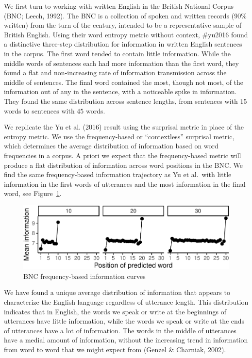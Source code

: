 \documentclass[man,floatsintext]{apa6}
\begin{document}
We first turn to working with written English in the British National Corpus (BNC; Leech, 1992). The BNC is a collection of spoken and written records (90\% written) from the turn of the century, intended to be a representative sample of British English. Using their word entropy metric without context, \#yu2016 found a distinctive three-step distribution for information in written English sentences in the corpus. The first word tended to contain little information. While the middle words of sentences each had more information than the first word, they found a flat and non-increasing rate of information transmission across the middle of sentences. The final word contained the most, though not most, of the information out of any in the sentence, with a noticeable spike in information. They found the same distribution across sentence lengths, from sentences with \(15\) words to sentences with \(45\) words.

We replicate the Yu et al. (2016) result using the surprisal metric in place of the entropy metric. We use the frequency-based or \enquote{contextless} surprisal metric, which determines the average distribution of information based on word frequencies in a corpus. A priori we expect that the frequency-based metric will produce a flat distribution of information across word positions in the BNC. We find the same frequency-based information trajectory as Yu et al.~with little information in the first words of utterances and the most information in the final word, see Figure~\ref{fig:bnc-unigrams}.

\begin{figure}
\centering
\includegraphics{figs/bnc-unigrams-1.pdf}
\caption{\label{fig:bnc-unigrams}BNC frequency-based information curves}
\end{figure}

We have found a unique average distribution of information that appears to characterize the English language regardless of utterance length. This distribution indicates that in English, the words we speak or write at the beginnings of utterances have little information, while the words we speak or write at the ends of utterances have a lot of information. The words in the middle of utterances have a medial amount of information, without the increasing trend in information from word to word that we might expect from (Genzel \& Charniak, 2002).
\end{document}

